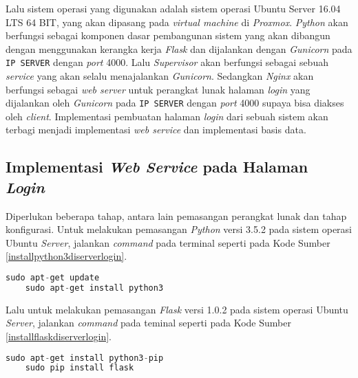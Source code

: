  Lalu sistem operasi yang digunakan adalah sistem operasi Ubuntu Server 16.04 LTS 64 BIT, yang akan dipasang pada \textit{virtual machine} di \textit{Proxmox}. \textit{Python} akan berfungsi sebagai komponen dasar pembangunan sistem yang akan dibangun dengan menggunakan kerangka kerja \textit{Flask} dan dijalankan dengan \textit{Gunicorn} pada \texttt{IP SERVER} dengan \textit{port} 4000. Lalu \textit{Supervisor} akan berfungsi sebagai sebuah \textit{service} yang akan selalu menajalankan \textit{Gunicorn}. Sedangkan \textit{Nginx} akan berfungsi sebagai \textit{web server} untuk perangkat lunak halaman \textit{login} yang dijalankan oleh \textit{Gunicorn} pada \texttt{IP SERVER} dengan \textit{port} 4000 supaya bisa diakses oleh \textit{client}. Implementasi pembuatan halaman \textit{login} dari sebuah sistem akan terbagi menjadi implementasi \textit{web service} dan implementasi basis data.
  
  \subsection{Implementasi \textit{Web Service} pada Halaman \textit{Login}}
  Diperlukan beberapa tahap, antara lain pemasangan perangkat lunak dan tahap konfigurasi. Untuk melakukan pemasangan \textit{Python} versi 3.5.2 pada sistem operasi Ubuntu \textit{Server}, jalankan \textit{command} pada terminal seperti pada Kode Sumber \ref{installpython3diserverlogin}.\\
  \begin{minipage}{\linewidth}
	\begin{lstlisting}[caption=Command untuk installasi Python,language=Python,label=installpython3diserverlogin]
	sudo apt-get update
	sudo apt-get install python3
	\end{lstlisting}
  \end{minipage}
  
  Lalu untuk melakukan pemasangan \textit{Flask} versi 1.0.2 pada sistem operasi Ubuntu \textit{Server}, jalankan \textit{command} pada teminal seperti pada Kode Sumber \ref{installflaskdiserverlogin}.\\  
  \begin{minipage}{\linewidth}
	\begin{lstlisting}[caption=Command untuk installasi Flask,language=Python,label=installflaskdiserverlogin]
	sudo apt-get install python3-pip
	sudo pip install flask
	\end{lstlisting}
  \end{minipage}
  
